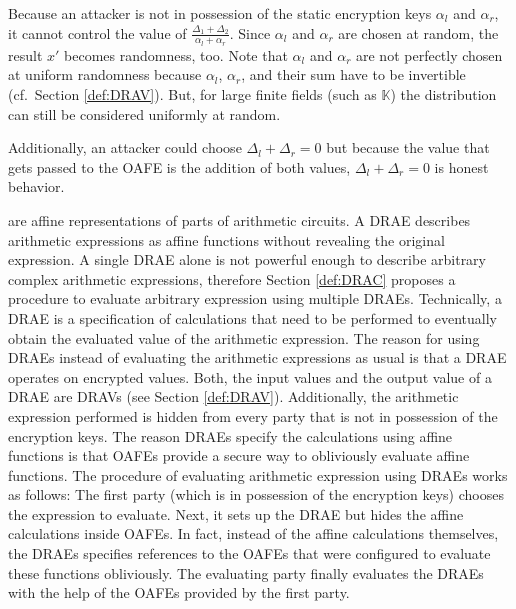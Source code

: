 \noindent{}Because an attacker is not in possession of the static encryption
keys $\alpha_l$ and $\alpha_r$, it cannot control the value of $\frac{\Delta_1 +
\Delta_2}{\alpha_l + \alpha_r}$. Since $\alpha_l$ and $\alpha_r$ are chosen at
random, the result $x'$ becomes randomness, too. Note that $\alpha_l$ and
$\alpha_r$ are not perfectly chosen at uniform randomness because $\alpha_l$,
$\alpha_r$, and their sum have to be invertible (cf.~Section \ref{def:DRAV}).
But, for large finite fields (such as $\mathbb{K}$) the distribution can still
be considered uniformly at random.

Additionally, an attacker could choose $\Delta_l + \Delta_r = 0$ but because the
value that gets passed to the OAFE is the addition of both values, $\Delta_l +
\Delta_r = 0$ is honest behavior.


%
%
\label{sec:drae}

 are affine representations of
parts of arithmetic circuits. A DRAE describes arithmetic expressions as affine
functions without revealing the original expression. A single DRAE alone is not
powerful enough to describe arbitrary complex arithmetic expressions, therefore
Section \ref{def:DRAC} proposes a procedure to evaluate arbitrary expression
using multiple DRAEs. Technically, a DRAE is a specification of calculations
that need to be performed to eventually obtain the evaluated value of the
arithmetic expression. The reason for using DRAEs instead of evaluating the
arithmetic expressions as usual is that a DRAE operates on encrypted values.
Both, the input values and the output value of a DRAE are DRAVs (see Section
\ref{def:DRAV}). Additionally, the arithmetic expression performed is hidden
from every party that is not in possession of the encryption keys. The reason
DRAEs specify the calculations using affine functions is that OAFEs provide a
secure way to obliviously evaluate affine functions. The procedure of evaluating
arithmetic expression using DRAEs works as follows: The first party (which is in
possession of the encryption keys) chooses the expression to evaluate.  Next, it
sets up the DRAE but hides the affine calculations inside OAFEs. In fact,
instead of the affine calculations themselves, the DRAEs specifies references to
the OAFEs that were configured to evaluate these functions obliviously. The
evaluating party finally evaluates the DRAEs with the help of the OAFEs provided
by the first party.


